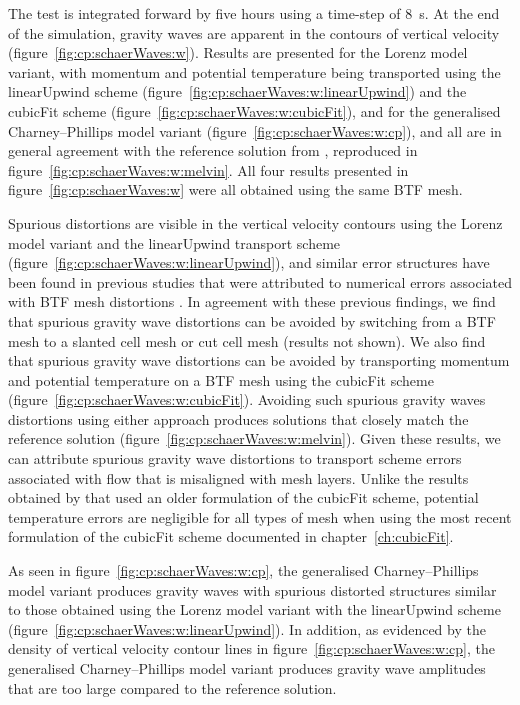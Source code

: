 The test is integrated forward by five hours using a time-step of \SI{8}{\second}.  At the end of the simulation, gravity waves are apparent in the contours of vertical velocity (figure~\ref{fig:cp:schaerWaves:w}).
Results are presented for the Lorenz model variant, with momentum and potential temperature being transported using the linearUpwind scheme (figure~\ref{fig:cp:schaerWaves:w:linearUpwind}) and the cubicFit scheme (figure~\ref{fig:cp:schaerWaves:w:cubicFit}), and for the generalised Charney--Phillips model variant (figure~\ref{fig:cp:schaerWaves:w:cp}), and all are in general agreement with the reference solution from \citet{melvin2010}, reproduced in figure~\ref{fig:cp:schaerWaves:w:melvin}.
All four results presented in figure~\ref{fig:cp:schaerWaves:w} were all obtained using the same BTF mesh.

Spurious distortions are visible in the vertical velocity contours using the Lorenz model variant and the linearUpwind transport scheme (figure~\ref{fig:cp:schaerWaves:w:linearUpwind}), and similar error structures have been found in previous studies that were attributed to numerical errors associated with BTF mesh distortions \citep{schaer2002,klemp2003}.
In agreement with these previous findings, we find that spurious gravity wave distortions can be avoided by switching from a BTF mesh to a slanted cell mesh or cut cell mesh (results not shown).
We also find that spurious gravity wave distortions can be avoided by transporting momentum and potential temperature on a BTF mesh using the cubicFit scheme (figure~\ref{fig:cp:schaerWaves:w:cubicFit}).
Avoiding such spurious gravity waves distortions using either approach produces solutions that closely match the reference solution (figure~\ref{fig:cp:schaerWaves:w:melvin}).
Given these results, we can attribute spurious gravity wave distortions to transport scheme errors associated with flow that is misaligned with mesh layers.
Unlike the results obtained by \citet{shaw-weller2016} that used an older formulation of the cubicFit scheme, potential temperature errors are negligible for all types of mesh when using the most recent formulation of the cubicFit scheme documented in chapter~\ref{ch:cubicFit}.

As seen in figure~\ref{fig:cp:schaerWaves:w:cp}, the generalised Charney--Phillips model variant produces gravity waves with spurious distorted structures similar to those obtained using the Lorenz model variant with the linearUpwind scheme (figure~\ref{fig:cp:schaerWaves:w:linearUpwind}).
In addition, as evidenced by the density of vertical velocity contour lines in figure~\ref{fig:cp:schaerWaves:w:cp}, the generalised Charney--Phillips model variant produces gravity wave amplitudes that are too large compared to the reference solution.

